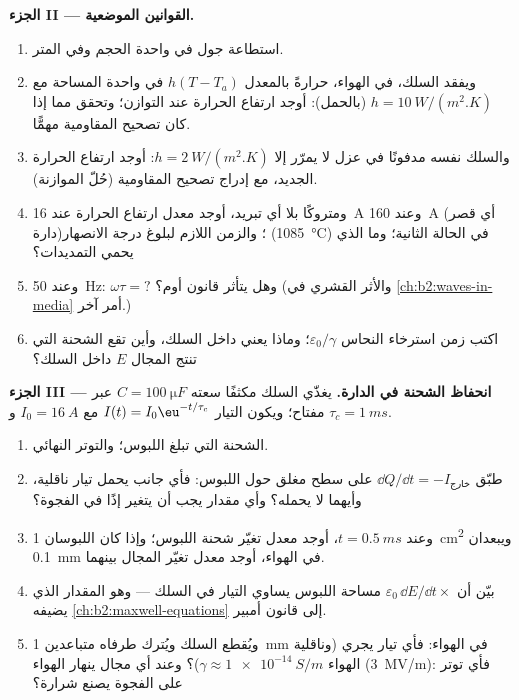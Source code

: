 \begin{problem}
\medskip
\noindent\textbf{الجزء II --- القوانين الموضعية.}
\begin{enumerate}[resume]
  \item استطاعة جول في واحدة الحجم وفي المتر.
  \item ويفقد السلك، في الهواء، حرارةً بالمعدل $h(T - T_a)$ في واحدة
        المساحة مع $h = \qty{10}{W/(m^2.K)}$ (بالحمل): أوجد ارتفاع
        الحرارة عند التوازن؛ وتحقق مما إذا كان تصحيح المقاومية
        مهمًّا.
  \item والسلك نفسه مدفونًا في عزل لا يمرّر إلا $h =
        \qty{2}{W/(m^2.K)}$: أوجد ارتفاع الحرارة الجديد، مع إدراج
        تصحيح المقاومية (حُلّ الموازنة).
  \item ومتروكًا بلا أي تبريد، أوجد معدل ارتفاع الحرارة عند \qty{16}{A}
        وعند \qty{160}{A} (أي قصر دارة)؛ والزمن اللازم لبلوغ درجة
        الانصهار (\qty{1085}{\degreeCelsius}) في الحالة الثانية؛ وما الذي يحمي
        التمديدات؟
  \item وعند \qty{50}{Hz}: $\omega\tau = ?$ وهل يتأثر قانون أوم؟ (والأثر
        القشري في \cref{ch:b2:waves-in-media} أمر آخر.)
  \item اكتب زمن استرخاء النحاس $\varepsilon_0/\gamma$؛ وماذا يعني
         داخل السلك، وأين تقع
        الشحنة التي تنتج المجال $E$ داخل السلك؟
\end{enumerate}

\medskip
\noindent\textbf{الجزء III --- انحفاظ الشحنة في الدارة.}
يغذّي السلك مكثفًا سعته $C = \qty{100}{\micro F}$ عبر مفتاح؛ ويكون
التيار $I(t) = I_0\eu^{-t/\tau_c}$ مع $I_0 = \qty{16}{A}$ و $\tau_c = \qty{1}{ms}$.
\begin{enumerate}[resume]
  \item الشحنة التي تبلغ اللبوس؛ والتوتر النهائي.
  \item طبّق $\dd Q/\dd t = -I_{\text{خارج}}$ على سطح مغلق حول
        اللبوس: فأي جانب يحمل تيار ناقلية، وأيهما لا يحمله؟
        وأي مقدار يجب أن يتغير إذًا في الفجوة؟
  \item وعند $t = \qty{0.5}{ms}$، أوجد معدل تغيّر شحنة اللبوس؛ وإذا كان
        اللبوسان \qty{1}{cm^2} ويبعدان \qty{0.1}{mm} في الهواء، أوجد معدل
        تغيّر المجال بينهما.
  \item بيّن أن $\varepsilon_0\,\dd E/\dd t \times$ مساحة اللبوس يساوي التيار
        في السلك --- وهو المقدار الذي يضيفه \cref{ch:b2:maxwell-equations}
        إلى قانون أمبير.
  \item ويُقطع السلك ويُترك طرفاه متباعدين \qty{1}{mm} في الهواء:
        فأي تيار يجري (وناقلية الهواء $\gamma \approx \qty{1e-14}{S/m}$)؟ وعند أي
        مجال ينهار الهواء (\qty{3}{MV/m}): فأي توتر على
        الفجوة يصنع شرارة؟
\end{enumerate}


\end{problem}
